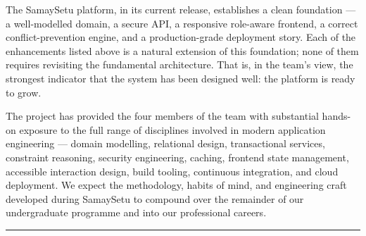 The SamaySetu platform, in its current release, establishes a clean foundation --- a well-modelled domain, a secure API, a responsive role-aware frontend, a correct conflict-prevention engine, and a production-grade deployment story. Each of the enhancements listed above is a natural extension of this foundation; none of them requires revisiting the fundamental architecture. That is, in the team's view, the strongest indicator that the system has been designed well: the platform is ready to grow.

The project has provided the four members of the team with substantial hands-on exposure to the full range of disciplines involved in modern application engineering --- domain modelling, relational design, transactional services, constraint reasoning, security engineering, caching, frontend state management, accessible interaction design, build tooling, continuous integration, and cloud deployment. We expect the methodology, habits of mind, and engineering craft developed during SamaySetu to compound over the remainder of our undergraduate programme and into our professional careers.

\vspace{10mm}
\hrule
